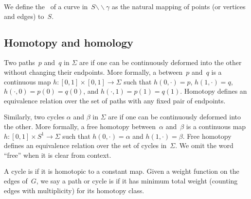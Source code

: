 \documentclass[letterpaper,review]{siamart190516}
\def\snip{\mathbin{\raisebox{0.15ex}{\rotatebox[origin=c]{60}{\Rightscissors}\!}}}
\def\snip{\mathbin{\backslash\!\!\backslash}}
\begin{document}
We define the~ of a curve in~$S \snip \gamma$ as the natural mapping of points (or vertices and edges) to~$S$. 


\subsection{Homotopy and homology}
\label{SS:homology}

Two paths~$p$ and~$q$ in $\Sigma$ are  if one can be continuously deformed into the other without changing their endpoints.
More formally, a  between~$p$ and~$q$ is a continuous map $h\colon {[0,1]\times [0,1] \to \Sigma}$ such that $h(0,\cdot) = p$, $h(1,\cdot) = q$, $h(\cdot, 0)=p(0)=q(0)$, and $h(\cdot,1)=p(1)=q(1)$.  Homotopy defines an equivalence relation over the set of paths with any fixed pair of endpoints.

Similarly, two cycles $\alpha$ and $\beta$ in $\Sigma$ are  if one can be
continuously deformed into the other.  More formally, a free homotopy between~$\alpha$ and~$\beta$
is a continuous map $h\colon {[0,1]\times S^1 \to \Sigma}$ such that $h(0,\cdot) = \alpha$ and
$h(1,\cdot) = \beta$.  Free homotopy defines an equivalence relation over the set of cycles
in~$\Sigma$.  We omit the word ``free'' when it is clear from context.

%
%
A cycle is  if it is homotopic to a constant map.
Given a weight function on the edges of~$G$, we say a path or cycle is  if it has minimum total weight (counting edges with multiplicity) for its homotopy class.
\end{document}

